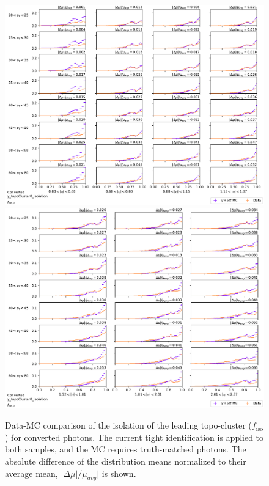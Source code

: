 \begin{figure}[!thp]
    \centering
    \includegraphics[width=.74\textwidth]{appendices/datamc_images/y_topoCluster0_isolation_Converted_lowerEta.pdf}
    \includegraphics[width=.74\textwidth]{appendices/datamc_images/y_topoCluster0_isolation_Converted_upperEta.pdf}
    \caption[Data-MC comparison of the isolation of the leading topo-cluster ($f_{\text{iso}}$)or converted photons]{Data-MC comparison of the isolation of the leading topo-cluster ($f_{\text{iso}}$) for converted photons. The current tight identification is applied to both samples, and the \gls{MC} requires truth-matched photons. The absolute difference of the distribution means normalized to their average mean, $|\Delta \mu|/\mu_{avg}|$ is shown.}
    \label{fig:dmc-c-iso}
\end{figure}
